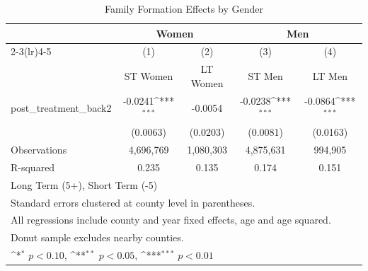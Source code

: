 \begin{table}[htbp]\centering
\def\sym#1{\ifmmode^{#1}\else\(^{#1}\)\fi}
\scriptsize
\caption{Family Formation Effects by Gender}
\begin{tabular}{l*{4}{c}}
\hline\hline
            &\multicolumn{2}{c}{Women}                  &\multicolumn{2}{c}{Men}                    \\\cmidrule(lr){2-3}\cmidrule(lr){4-5}
            &\multicolumn{1}{c}{(1)}&\multicolumn{1}{c}{(2)}&\multicolumn{1}{c}{(3)}&\multicolumn{1}{c}{(4)}\\
            &\multicolumn{1}{c}{ST Women}&\multicolumn{1}{c}{LT Women}&\multicolumn{1}{c}{ST Men}&\multicolumn{1}{c}{LT Men}\\
\hline
post\_treatment\_back2&     -0.0241\sym{***}&     -0.0054         &     -0.0238\sym{***}&     -0.0864\sym{***}\\
            &    (0.0063)         &    (0.0203)         &    (0.0081)         &    (0.0163)         \\
\hline
Observations&   4,696,769         &   1,080,303         &   4,875,631         &     994,905         \\
R-squared   &       0.235         &       0.135         &       0.174         &       0.151         \\
\hline\hline
\multicolumn{5}{l}{\footnotesize Long Term (5+), Short Term (-5)}\\
\multicolumn{5}{l}{\footnotesize Standard errors clustered at county level in parentheses.}\\
\multicolumn{5}{l}{\footnotesize All regressions include county and year fixed effects, age and age squared.}\\
\multicolumn{5}{l}{\footnotesize Donut sample excludes nearby counties.}\\
\multicolumn{5}{l}{\footnotesize \sym{*} \(p<0.10\), \sym{**} \(p<0.05\), \sym{***} \(p<0.01\)}\\
\end{tabular}
\end{table}
